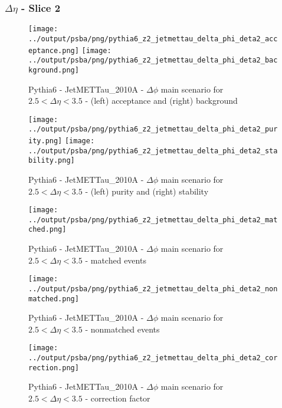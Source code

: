 \documentclass[11pt]{book}
\begin{document}
\clearpage
\subsubsection{$\Delta\eta$ - Slice 2}

\begin{figure}[ht]
\centering
\texttt{[image: ../output/psba/png/pythia6\_z2\_jetmettau\_delta\_phi\_deta2\_acceptance.png]}
\texttt{[image: ../output/psba/png/pythia6\_z2\_jetmettau\_delta\_phi\_deta2\_background.png]}
\caption{Pythia6 - JetMETTau\_2010A - $\Delta\phi$ main scenario for $2.5 < \Delta\eta < 3.5$ - (left) acceptance and (right) background}
\label{fig:p6_jetmettau_delta_phi_deta2_ab}
\end{figure}

\begin{figure}[ht]
\centering
\texttt{[image: ../output/psba/png/pythia6\_z2\_jetmettau\_delta\_phi\_deta2\_purity.png]}
\texttt{[image: ../output/psba/png/pythia6\_z2\_jetmettau\_delta\_phi\_deta2\_stability.png]}
\caption{Pythia6 - JetMETTau\_2010A - $\Delta\phi$ main scenario for $2.5 < \Delta\eta < 3.5$ - (left) purity and (right) stability}
\label{fig:p6_jetmettau_delta_phi_deta2_ps}
\end{figure}

\begin{figure}[ht]
\centering
\texttt{[image: ../output/psba/png/pythia6\_z2\_jetmettau\_delta\_phi\_deta2\_matched.png]}
\caption{Pythia6 - JetMETTau\_2010A - $\Delta\phi$ main scenario for $2.5 < \Delta\eta < 3.5$ - matched events}
\label{fig:p6_jetmettau_delta_phi_deta2_matched}
\end{figure}

\begin{figure}[ht]
\centering
\texttt{[image: ../output/psba/png/pythia6\_z2\_jetmettau\_delta\_phi\_deta2\_nonmatched.png]}
\caption{Pythia6 - JetMETTau\_2010A - $\Delta\phi$ main scenario for $2.5 < \Delta\eta < 3.5$ - nonmatched events}
\label{fig:p6_jetmettau_delta_phi_deta2_nonmatched}
\end{figure}

\begin{figure}[ht]
\centering
\texttt{[image: ../output/psba/png/pythia6\_z2\_jetmettau\_delta\_phi\_deta2\_correction.png]}
\caption{Pythia6 - JetMETTau\_2010A - $\Delta\phi$ main scenario for $2.5 < \Delta\eta < 3.5$ - correction factor}
\label{fig:p6_jetmettau_delta_phi_deta2_correction}
\end{figure}
\end{document}
